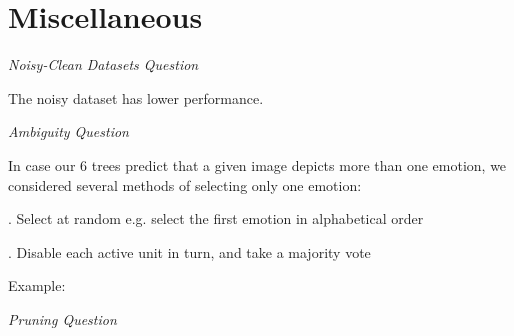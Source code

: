 \documentclass[12pt, a4paper, portrait]{article}
\begin{document}
\section*{Miscellaneous}
\textit{Noisy-Clean Datasets Question}\par
\bigskip
The noisy dataset has lower performance.\par
\bigskip
\textit{Ambiguity Question}\par
\bigskip
In case our 6 trees predict that a given image depicts more than one emotion, we considered several methods of selecting only one emotion:\par
{}. Select at random e.g. select the first emotion in alphabetical order\par
{}. Disable each active unit in turn, and take a majority vote\par
Example:\par
\bigskip
\textit{Pruning Question}\par
\bigskip
\end{document}
